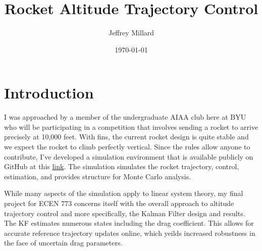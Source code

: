 \documentclass{article}
\title{Rocket Altitude Trajectory Control}
\date{\today}
\author{Jeffrey Millard}
\begin{document}
\maketitle


\section{Introduction}
  I was approached by a member of the undergraduate AIAA club here at BYU who will be participating in a competition that involves sending a rocket to arrive precisely at 10,000 feet. With fins, the current rocket design is quite stable and we expect the rocket to climb perfectly vertical. Since the rules allow anyone to contribute, I've developed a simulation environment that is available publicly on GitHub at this \href{http://www.texample.net/tikz/resources/}{link}. The simulation simulates the rocket trajectory, control, estimation, and provides structure for Monte Carlo analysis.

  While many aspects of the simulation apply to linear system theory, my final project for ECEN 773 concerns itself with the overall approach to altitude trajectory control and more specifically, the Kalman Filter design and results. The KF estimates numerous states including the drag coefficient. This allows for accurate reference trajectory updates online, which yeilds increased robustness in the face of uncertain drag parameters.
\end{document}
